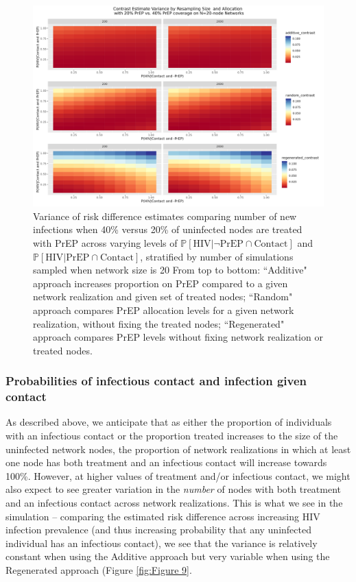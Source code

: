 \documentclass{article}
\theoremstyle{definition}
\begin{document}
\begin{figure}[H]
    \centering
    \includegraphics[width=\linewidth]{Corrected Figures/Resampling Size Variance Plot.png}
    \caption{Variance of risk difference estimates comparing number of new infections when 40\% versus 20\% of uninfected nodes are treated with PrEP across varying levels of $\mathbb{P}\left[\text{HIV} \vert \neg \text{PrEP} \cap \text{Contact}\right]$ and $\mathbb{P}\left[\text{HIV} \vert \text{PrEP} \cap \text{Contact}\right]$, stratified by number of simulations sampled when network size is 20 %
    From top to bottom: ``Additive" approach increases proportion on PrEP compared to a given network realization and given set of treated nodes; ``Random" approach compares PrEP allocation levels for a given network realization, without fixing the treated nodes; ``Regenerated" approach compares PrEP levels without fixing network realization or treated nodes. }
    \label{fig:Figure 8}
\end{figure}

\subsubsection{Probabilities of infectious contact and infection given contact}
As described above, we anticipate that as either the proportion of individuals with an infectious contact or the proportion treated increases to the size of the uninfected network nodes, the proportion of network realizations in which at least one node has both treatment and an infectious contact will increase towards 100\%. However, at higher values of treatment and/or infectious contact, we might also expect to see greater variation in the \textit{number} of nodes with both treatment and an infectious contact across network realizations. This is what we see in the simulation -- comparing the estimated risk difference across increasing HIV infection prevalence (and thus increasing probability that any uninfected individual has an infectious contact), we see that the variance is relatively constant when using the Additive approach but very variable when using the Regenerated approach (Figure \ref{fig:Figure 9}.
\end{document}
